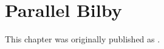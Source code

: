 \chapter[Parallel Bilby]{Parallel Bilby}
\label{cp.pbilby}

This chapter was originally published as \cite{}.


